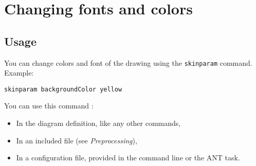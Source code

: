 %
%
% 
%
%
%
%
%
% 

\section{Changing fonts and colors}

\subsection{Usage}

You can change colors and font of the drawing using the \texttt{skinparam} command. 
Example: 

\begin{lstlisting}
skinparam backgroundColor yellow 
\end{lstlisting}


You can use this command : 

\begin{itemize}
\item In the diagram definition, like any other commands, 
\item In an included file (see \textit{Preprocessing}), 
\item In a configuration file, provided in the command line or the ANT task.
\end{itemize}

